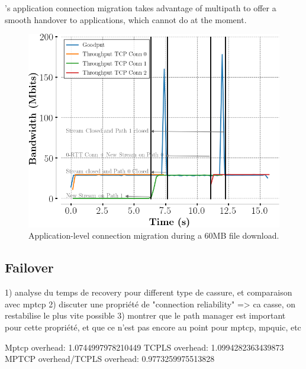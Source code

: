 \tcpls's application connection migration takes advantage of multipath to offer
a smooth handover to applications, which \tcpls cannot do at the moment.

\begin{figure}[!t]
  \centering
  \includegraphics[width=\columnwidth]{figures/migration.png}
  \caption{Application-level connection migration during a 60MB file download.}
  \label{fig:conn_migration}
\end{figure}

\subsection{Failover}

1) analyse du temps de recovery pour different type de cassure, et comparaison avec mptcp
2) discuter une propriété de "connection reliability" => ca casse, on restabilise le plus vite possible
3) montrer que le path manager est important pour cette propriété, et que ce n'est pas encore au point pour mptcp, mpquic, etc

Mptcp overhead: 1.0744997978210449
TCPLS overhead: 1.0994282363439873
MPTCP overhead/TCPLS overhead:              0.9773259975513828


